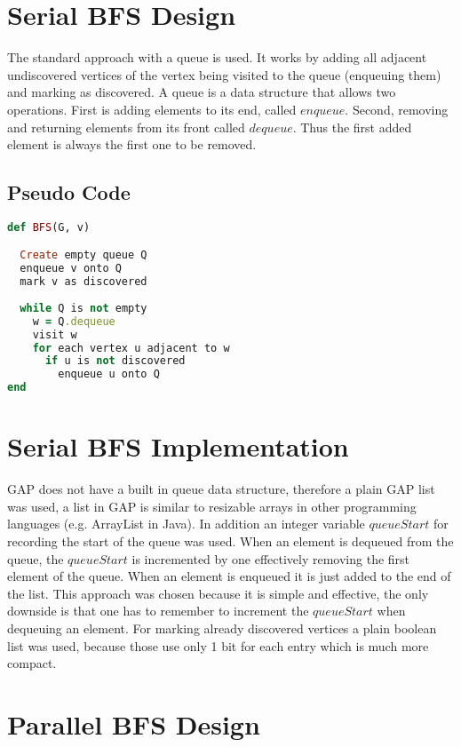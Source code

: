 \documentclass{report}
\theoremstyle{plain}
\theoremstyle{definition}
\theoremstyle{remark}
\begin{document}
\section{Serial BFS Design}
 
The standard approach with a queue is used. It works by adding all adjacent undiscovered vertices of the vertex being visited to the queue (enqueuing them) and marking as discovered. A queue is a data structure that allows two operations. First is adding elements to its end, called $enqueue$. Second, removing and returning elements from its front called $dequeue$. Thus the first added element is always the first one to be removed.

\subsection*{Pseudo Code}

\begin{lstlisting}[language=Ruby]
def BFS(G, v)

  Create empty queue Q
  enqueue v onto Q
  mark v as discovered
  
  while Q is not empty
    w = Q.dequeue
    visit w
    for each vertex u adjacent to w
      if u is not discovered
        enqueue u onto Q
end
\end{lstlisting}

\section{Serial BFS Implementation}

GAP does not have a built in queue data structure, therefore a plain GAP list was used, a list in GAP is similar to resizable arrays in other programming languages (e.g. ArrayList in Java). In addition an integer variable $queueStart$ for recording the start of the queue was used. When an element is dequeued from the queue, the $queueStart$ is incremented by one effectively removing the first element of the queue. When an element is enqueued it is just added to the end of the list. This approach was chosen because it is simple and effective, the only downside is that one has to remember to increment the $queueStart$ when dequeuing an element. For marking already discovered vertices a plain boolean list was used, because those use only 1 bit for each entry which is much more compact.

\section{Parallel BFS Design}
\end{document}
